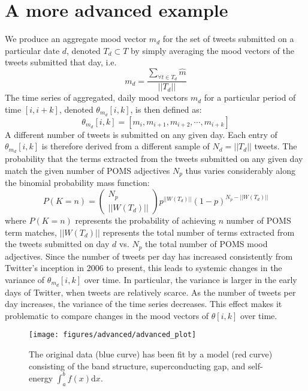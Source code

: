 \documentclass{article}
\begin{document}
\section{A more advanced example}
We produce an aggregate mood vector $m_d$ for the set of tweets submitted on a particular date $d$, denoted $T_d \subset T$ by simply averaging the mood vectors of the tweets submitted that day, i.e.
\[m_d = \frac{\sum_{\forall t \in T_d} \hat{m}}{||T_d||}\]
The time series of aggregated, daily mood vectors $m_d$ for a particular period of time $[i,i+k]$, denoted $\theta_{m_d}[i,k]$, is then defined as:
\[ \theta_{m_d}[i,k] = [ m_{i}, m_{i+1}, m_{i+2}, \cdots, m_{i+k}] \]
A different number of tweets is submitted on any given day. Each entry of $ \theta_{m_d}[i,k]$ is therefore derived from a different sample of $N_d = ||T_d||$ tweets. The probability that the terms extracted from the tweets submitted on any given day match the given number of POMS adjectives $N_p$ thus varies considerably along the binomial probability mass function:
\[P(K=n) = \left(\begin{array}{c}N_p\\||W(T_d)||\end{array}\right)p^{||W(T_d)||}(1-p)^{N_p-||W(T_d)||}\]
where $P(K=n)$ represents the probability of achieving $n$ number of POMS term matches, $||W(T_d)||$ represents the total number of terms extracted from the tweets submitted on day $d$ vs. $N_p$ the total number of POMS mood adjectives. Since the number of tweets per day has increased consistently from Twitter's inception in 2006 to present, this leads to systemic changes in the variance of $\theta_{m_d}[i,k]$ over time.  In particular, the variance is larger in the early days of Twitter, when tweets are relatively scarce. As the number of tweets per day increases, the variance of the time series decreases. This effect makes it problematic to compare changes in the mood vectors of $\theta[i,k]$ over time.

\begin{figure}[h!]
\begin{center}
\texttt{[image: figures/advanced/advanced\_plot]}
\caption{The original data (blue curve) has been fit by a model (red curve) consisting of the band structure, superconducting gap, and self-energy $\int_a^b f(x)\mathrm{d}x$.%
}
\end{center}
\end{figure}


\end{document}
